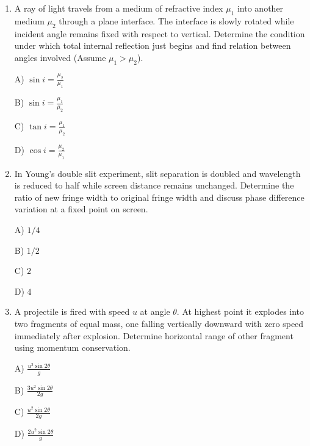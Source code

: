 \documentclass[12pt]{article}
\begin{document}
\begin{enumerate}
A) \(\dfrac{u}{2}\)  

B) \(\dfrac{u}{\sqrt{3}}\)

C) \(\dfrac{u}{3}\)  

D) \(\dfrac{u}{\sqrt{2}}\)

\item A ray of light travels from a medium of refractive index \(\mu_1\) into another medium \(\mu_2\) through a plane interface. The interface is slowly rotated while incident angle remains fixed with respect to vertical. Determine the condition under which total internal reflection just begins and find relation between angles involved (Assume $\mu_1 > \mu_2$).


\begin{center}
\end{center}

A) \(\sin i = \frac{\mu_2}{\mu_1}\)  

B) \(\sin i = \frac{\mu_1}{\mu_2}\)

C) \(\tan i = \frac{\mu_1}{\mu_2}\)  

D) \(\cos i = \frac{\mu_2}{\mu_1}\)

\item In Young’s double slit experiment, slit separation is doubled and wavelength is reduced to half while screen distance remains unchanged. Determine the ratio of new fringe width to original fringe width and discuss phase difference variation at a fixed point on screen.

A) \(1/4\) 

B) \(1/2\)  

C) \(2\)  

D) \(4\)

\item A projectile is fired with speed \(u\) at angle \(\theta\). At highest point it explodes into two fragments of equal mass, one falling vertically downward with zero speed immediately after explosion. Determine horizontal range of other fragment using momentum conservation.

A) \(\frac{u^2\sin2\theta}{g}\)  

B) \(\frac{3u^2\sin2\theta}{2g}\) 

C) \(\frac{u^2\sin2\theta}{2g}\)  

D) \(\frac{2u^2\sin2\theta}{g}\)



\end{enumerate}
\end{document}
